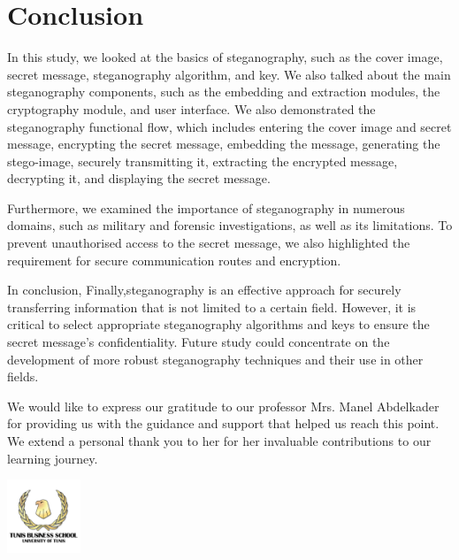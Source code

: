 \chapter{Conclusion}

In this study, we looked at the basics of steganography, such as the cover image, secret message, steganography algorithm, and key. We also talked about the main steganography components, such as the embedding and extraction modules, the cryptography module, and user interface. We also demonstrated the steganography functional flow, which includes entering the cover image and secret message, encrypting the secret message, embedding the message, generating the stego-image, securely transmitting it, extracting the encrypted message, decrypting it, and displaying the secret message.

Furthermore, we examined the importance of steganography in numerous domains, such as military and forensic investigations, as well as its limitations. To prevent unauthorised access to the secret message, we also highlighted the requirement for secure communication routes and encryption.

In conclusion, Finally,steganography is an effective approach for securely transferring information that is not limited to a certain field. However, it is critical to select appropriate steganography algorithms and keys to ensure the secret message's confidentiality. Future study could concentrate on the development of more robust steganography techniques and their use in other fields.

We would like to express our gratitude to our professor Mrs. Manel Abdelkader for providing us with the guidance and support that helped us reach this point. We extend a personal
thank you to her for her invaluable contributions to our learning journey.

\begin{flushright}
\includegraphics[width=22mm]{figures/tbs.png}
\end{flushright}
